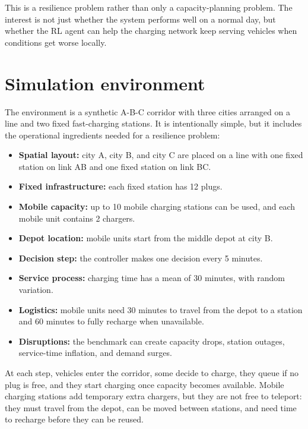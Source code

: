 \documentclass[11pt]{article}
\providecommand{\tightlist}{%
      \setlength{\itemsep}{0pt}\setlength{\parskip}{0pt}}
\begin{document}
This is a resilience problem rather than only a capacity-planning
problem. The interest is not just whether the system performs well on a
normal day, but whether the RL agent can help the charging network keep
serving vehicles when conditions get worse locally.

    \hypertarget{toc-simulation-environment}{}
    \section{Simulation environment}\label{simulation-environment}

The environment is a synthetic A-B-C corridor with three cities arranged
on a line and two fixed fast-charging stations. It is intentionally
simple, but it includes the operational ingredients needed for a
resilience problem:

\begin{itemize}
\tightlist
\item
  \textbf{Spatial layout:} city A, city B, and city C are placed on a
  line with one fixed station on link AB and one fixed station on link
  BC.
\item
  \textbf{Fixed infrastructure:} each fixed station has 12 plugs.
\item
  \textbf{Mobile capacity:} up to 10 mobile charging stations can be
  used, and each mobile unit contains 2 chargers.
\item
  \textbf{Depot location:} mobile units start from the middle depot at
  city B.
\item
  \textbf{Decision step:} the controller makes one decision every 5
  minutes.
\item
  \textbf{Service process:} charging time has a mean of 30 minutes, with
  random variation.
\item
  \textbf{Logistics:} mobile units need 30 minutes to travel from the
  depot to a station and 60 minutes to fully recharge when unavailable.
\item
  \textbf{Disruptions:} the benchmark can create capacity drops, station
  outages, service-time inflation, and demand surges.
\end{itemize}

At each step, vehicles enter the corridor, some decide to charge, they
queue if no plug is free, and they start charging once capacity becomes
available. Mobile charging stations add temporary extra chargers, but
they are not free to teleport: they must travel from the depot, can be
moved between stations, and need time to recharge before they can be
reused.
\end{document}
